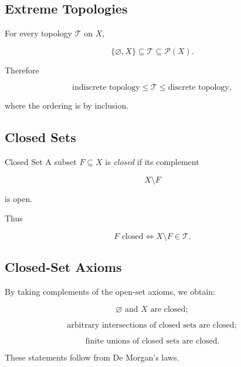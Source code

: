 \subsection{Extreme Topologies}
\label{subsec:extreme-topologies}

For every topology \(\mathcal{T}\) on \(X\),

\[
\boxed{
\{\varnothing,X\}
\subseteq
\mathcal{T}
\subseteq
\mathcal{P}(X).
}
\]

Therefore

\[
\boxed{
\text{indiscrete topology}
\leq
\mathcal{T}
\leq
\text{discrete topology},
}
\]

where the ordering is by inclusion.

\subsection{Closed Sets}
\label{subsec:closed-sets}

\begin{definitionbox}{Closed Set}
A subset \(F\subseteq X\) is \emph{closed} if its complement

\[
\boxed{
X\setminus F
}
\]

is open.
\end{definitionbox}

Thus

\[
\boxed{
F\text{ closed}
\iff
X\setminus F\in\mathcal{T}.
}
\]

\subsection{Closed-Set Axioms}
\label{subsec:closed-set-axioms}

By taking complements of the open-set axioms, we obtain:

\[
\boxed{
\varnothing\text{ and }X\text{ are closed};
}
\]

\[
\boxed{
\text{arbitrary intersections of closed sets are closed};
}
\]

\[
\boxed{
\text{finite unions of closed sets are closed}.
}
\]

These statements follow from De Morgan's laws.


